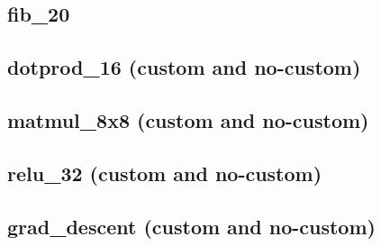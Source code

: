 \subsection{fib\_20}
\subsection{dotprod\_16 (custom and no-custom)}
\subsection{matmul\_8x8 (custom and no-custom)}
\subsection{relu\_32 (custom and no-custom)}
\subsection{grad\_descent (custom and no-custom)}
